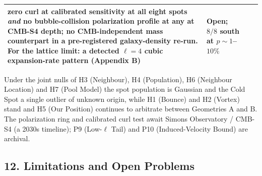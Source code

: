 \documentclass[
]{article}
\begin{document}
\begin{longtable}[]{@{}llll@{}}
\begin{minipage}[t]{0.22\columnwidth}
zero curl at calibrated sensitivity at all eight spots \emph{and} no
bubble-collision polarization profile at any at CMB-S4 depth; no
CMB-independent mass counterpart in a pre-registered galaxy-density
re-run. For the lattice limit: a detected \(\ell=4\) cubic
expansion-rate pattern (Appendix B)\strut
\end{minipage} & \begin{minipage}[t]{0.22\columnwidth}\raggedright
Open; \(8/8\) south at \(p \sim 1\)--\(10\%\)\strut
\end{minipage}\tabularnewline
\bottomrule
\end{longtable}

Under the joint nulls of H3 (Neighbour), H4 (Population), H6 (Neighbour
Location) and H7 (Pool Model) the spot population is Gaussian and the
Cold Spot a single outlier of unknown origin, while H1 (Bounce) and H2
(Vortex) stand and H5 (Our Position) continues to arbitrate between
Geometries A and B. The polarization ring and calibrated curl test await
Simons Observatory / CMB-S4 (a 2030s timeline); P9 (Low-\(\ell\) Tail)
and P10 (Induced-Velocity Bound) are archival.

\hypertarget{limitations-and-open-problems}{%
\subsection{\texorpdfstring{\textbf{12. Limitations and Open
Problems}}{12. Limitations and Open Problems}}\label{limitations-and-open-problems}}
\end{document}
